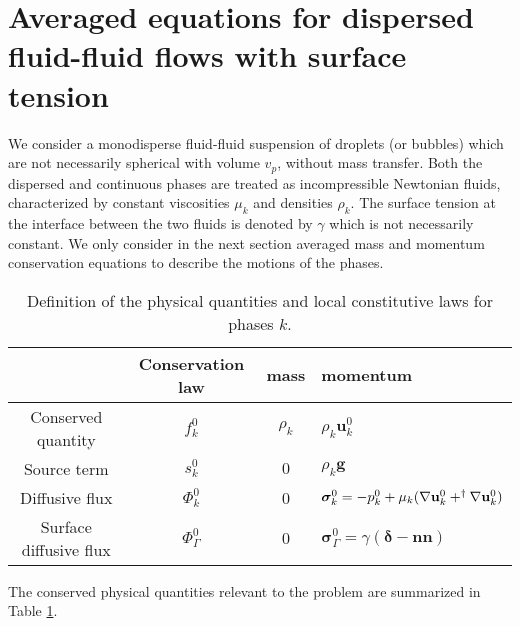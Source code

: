 \section{Averaged equations for dispersed fluid-fluid flows with surface tension}%
\label{sec:averaged_surface}


We consider a monodisperse fluid-fluid suspension of droplets (or bubbles) which are not necessarily spherical with volume $ v_p $, without mass transfer. 
Both the dispersed and continuous phases are treated as incompressible Newtonian fluids, characterized by constant viscosities $ \mu_k $ and densities $ \rho_k $. 
The surface tension at the interface between the two fluids is denoted by $ \gamma $ which is not necessarily constant. 
We only consider in the next section averaged mass and momentum conservation equations to describe the motions of the phases. 
\begin{table}
    \centering
    \begin{tabular}{|c|ccl|}\hline
    & Conservation law & mass & momentum \\ \hline
    Conserved quantity & $f_k^0$  & $\rho_k$ & $\rho_k \textbf{u}_k^0$ \\
    Source term & $s_k^0$  & $0$ & $\rho_k \textbf{g}$ \\
    Diffusive flux & $\Phi_k^0$ & 0 & $\bm\sigma_k^0 = -p_k^0 + \mu_k (\mathbf{\nabla} \textbf{u}_k^0 + ^\dagger\mathbf{\nabla} \textbf{u}_k^0)$ \\
    Surface diffusive flux & $\Phi_\Gamma^0$ & 0 & $\bm\sigma_\Gamma^0 = \gamma (\bm\delta - \textbf{nn})$ \\\hline
    \end{tabular}

    \caption{Definition of the physical quantities and local constitutive laws for phases $k$.}
    \label{tab:qte_Newtonian}
\end{table}
The conserved physical quantities  relevant to the problem are summarized in Table \ref{tab:qte_Newtonian}.


